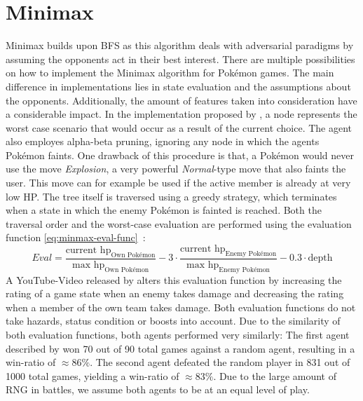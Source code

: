\section{Minimax}
\label{sec:related-minimax}
Minimax builds upon \ac{BFS} as this algorithm deals with adversarial paradigms by assuming the opponents 
act in their best interest.
There are multiple possibilities on how to implement the Minimax algorithm for Pokémon games. The main difference 
in implementations lies in state evaluation and the assumptions about the opponents. Additionally,
the amount of features taken into consideration have a considerable impact. In the implementation proposed by
\cite{Lee_Togelius_2017}, a node represents the worst case scenario that would occur as a result of the current choice. 
The agent also employes alpha-beta pruning, ignoring any node in which the agents Pokémon faints. 
One drawback of this procedure is that, a Pokémon would never use the move \textit{Explosion},
a very powerful \textit{Normal}-type move that also faints the user. This move can for example be used if
the active member is already at very low \ac{HP}.
The tree itself is traversed using a greedy strategy, which terminates when a state in which the enemy 
Pokémon is fainted is reached. Both the traversal order and the worst-case evaluation are performed using
the evaluation function \ref{eq:minmax-eval-func}~\autocite{Lee_Togelius_2017}:
\begin{equation}
\label{eq:minmax-eval-func}
    Eval = \frac{\text{current hp}_{\text{Own Pokémon}}}{\text{max hp}_{\text{Own Pokémon}}} -
    3 \cdot \frac{\text{current hp}_{\text{Enemy Pokémon}}}{\text{max hp}_{\text{Enemy Pokémon}}} -
    0.3 \cdot \text{depth}
\end{equation}
A YouTube-Video released by \cite{RemptonGames:PokemonAI}
alters this evaluation function
by increasing the rating of a game state when an enemy takes damage and decreasing the rating when a member
of the own team takes damage. Both evaluation functions do not take hazards, status condition or boosts 
into account. Due to the similarity of both evaluation functions, both agents performed very similarly:
The first agent described by \cite{Lee_Togelius_2017} won 70 out of 90 total games against a random agent,
resulting in a win-ratio of $\approx 86\%$. The second agent defeated the random player in 831 out of 1000
total games, yielding a win-ratio of $\approx 83\%$. Due to the large amount of \ac{RNG} in battles, we assume
both agents to be at an equal level of play. \\
